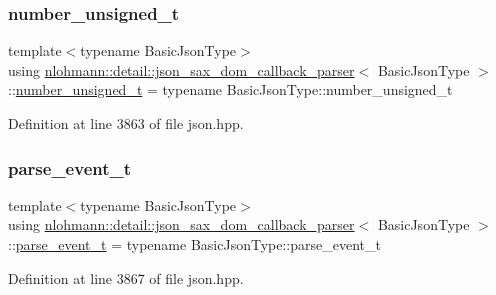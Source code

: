 \subsubsection{\texorpdfstring{number\+\_\+unsigned\+\_\+t}{number\_unsigned\_t}}
{\footnotesize\ttfamily template$<$typename Basic\+Json\+Type$>$ \\
using \hyperlink{classnlohmann_1_1detail_1_1json__sax__dom__callback__parser}{nlohmann\+::detail\+::json\+\_\+sax\+\_\+dom\+\_\+callback\+\_\+parser}$<$ Basic\+Json\+Type $>$\+::\hyperlink{structnlohmann_1_1json__sax_a32028cc056ae0f43aaae331cdbbbf856}{number\+\_\+unsigned\+\_\+t} =  typename Basic\+Json\+Type\+::number\+\_\+unsigned\+\_\+t}



Definition at line 3863 of file json.\+hpp.

\mbox{\label{classnlohmann_1_1detail_1_1json__sax__dom__callback__parser_aac6d706967b2ecc2510e172577d8550b}} 
\subsubsection{\texorpdfstring{parse\+\_\+event\+\_\+t}{parse\_event\_t}}
{\footnotesize\ttfamily template$<$typename Basic\+Json\+Type$>$ \\
using \hyperlink{classnlohmann_1_1detail_1_1json__sax__dom__callback__parser}{nlohmann\+::detail\+::json\+\_\+sax\+\_\+dom\+\_\+callback\+\_\+parser}$<$ Basic\+Json\+Type $>$\+::\hyperlink{classnlohmann_1_1detail_1_1json__sax__dom__callback__parser_aac6d706967b2ecc2510e172577d8550b}{parse\+\_\+event\+\_\+t} =  typename Basic\+Json\+Type\+::parse\+\_\+event\+\_\+t}



Definition at line 3867 of file json.\+hpp.

\mbox{\label{classnlohmann_1_1detail_1_1json__sax__dom__callback__parser_a4f636086fa8e7cf26c35c8afd50903ce}} 
